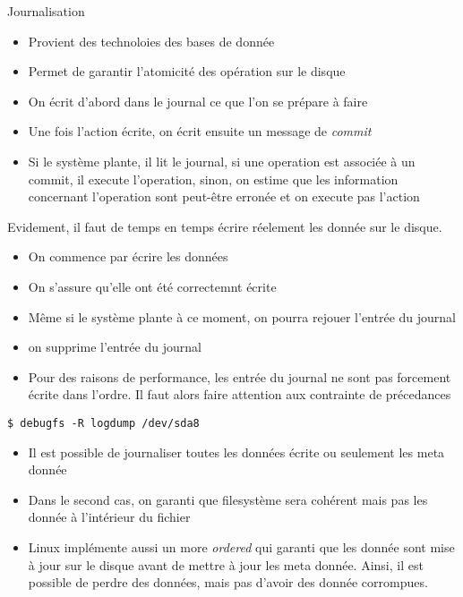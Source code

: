 \begin{frame}[fragile=singleslide]{Journalisation}
  \begin{itemize}
  \item Provient des technoloies des bases de donnée
  \item Permet de garantir l'atomicité des opération sur le disque
  \item On  écrit d'abord  dans le  journal ce que  l'on se  prépare à
    faire
  \item  Une fois  l'action écrite,  on  écrit ensuite  un message  de
    \emph{commit}
  \item Si le système plante, il  lit le journal, si une operation est
    associée à un commit, il execute l'operation, sinon, on estime que
    les information  concernant l'operation sont  peut-être erronée et
    on execute pas l'action
  \end{itemize}
  Evidement, il faut de temps en temps écrire réelement les donnée sur
  le disque.
  \begin{itemize}
  \item On commence par écrire les données
  \item On s'assure qu'elle ont été correctemnt écrite
  \item  Même si  le système  plante à  ce moment,  on  pourra rejouer
    l'entrée du journal
  \item on supprime l'entrée du journal
  \item Pour des raisons de performance, les entrée du journal ne sont
    pas forcement  écrite dans l'ordre. Il faut  alors faire attention
    aux contrainte de précedances
  \end{itemize}
  \begin{lstlisting}
$ debugfs -R logdump /dev/sda8
  \end{lstlisting}
  \begin{itemize}
  \item Il  est possible de  journaliser toutes les données  écrite ou
    seulement les meta donnée
  \item Dans le  second cas, on garanti que  filesystème sera cohérent
    mais pas les donnée à l'intérieur du fichier
  \item Linux implémente aussi  un more \emph{ordered} qui garanti que
    les donnée sont  mise à jour sur le disque avant  de mettre à jour
    les meta  donnée. Ainsi,  il est possible  de perdre  des données,
    mais pas d'avoir des donnée corrompues.
  \end{itemize}
\end{frame}

